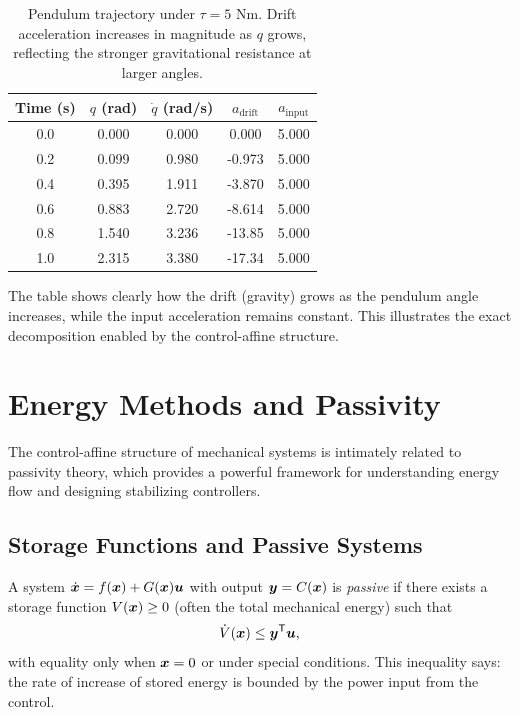 \begin{table}[h]
\centering
\begin{tabular}{c|cccc}
Time (s) & $q$ (rad) & $\dot q$ (rad/s) & $a_{\text{drift}}$ & $a_{\text{input}}$ \\
\hline
0.0 & 0.000 & 0.000 & 0.000 & 5.000 \\
0.2 & 0.099 & 0.980 & -0.973 & 5.000 \\
0.4 & 0.395 & 1.911 & -3.870 & 5.000 \\
0.6 & 0.883 & 2.720 & -8.614 & 5.000 \\
0.8 & 1.540 & 3.236 & -13.85 & 5.000 \\
1.0 & 2.315 & 3.380 & -17.34 & 5.000 \\
\end{tabular}
\caption{Pendulum trajectory under $\tau = 5$ N\textperiodcentered{}m. Drift acceleration increases in magnitude as
$q$ grows, reflecting the stronger gravitational resistance at larger angles.}
\label{tab:ch3:pendulum-traj}
\end{table}

The table shows clearly how the drift (gravity) grows as the pendulum angle increases, while
the input acceleration remains constant. This illustrates the exact decomposition enabled by
the control-affine structure.


\section{Energy Methods and Passivity}

The control-affine structure of mechanical systems is intimately related to passivity theory,
which provides a powerful framework for understanding energy flow and designing stabilizing
controllers.

\subsection{Storage Functions and Passive Systems}

A system $\dot{\bm{x}} = f(\bm{x}) + G(\bm{x})\bm{u}$ with output $\bm{y} = C(\bm{x})$ is \emph{passive} if there
exists a storage function $V(\bm{x}) \geq 0$ (often the total mechanical energy) such that
\begin{equation}
\dot V(\bm{x}) \leq \bm{y}^{\mathsf{T}} \bm{u},
\label{eq:ch3:passivity-def}
\end{equation}
with equality only when $\bm{x} = 0$ or under special conditions. This inequality says: the rate of
increase of stored energy is bounded by the power input from the control.

